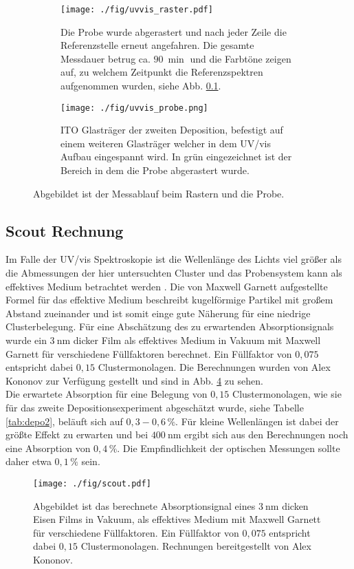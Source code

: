 \begin{figure}
    \begin{subfigure}[b]{0.65\textwidth}
      \texttt{[image: ./fig/uvvis\_raster.pdf]}
      \caption{Die Probe wurde abgerastert und nach jeder Zeile die Referenzstelle erneut angefahren. 
      Die gesamte Messdauer betrug ca. $\SI{90}{\min}$ und die Farbtöne zeigen auf, zu welchem Zeitpunkt die Referenzspektren aufgenommen wurden, siehe Abb. \ref{sec:scoutsim}.}
      \label{fig:uvvis_raster}
    \end{subfigure}\hfill
    \begin{subfigure}[b]{0.325\textwidth}
      \texttt{[image: ./fig/uvvis\_probe.png]}
      \caption{ITO Glasträger der zweiten Deposition, befestigt auf einem weiteren Glasträger welcher in dem UV/vis Aufbau eingespannt wird. In grün eingezeichnet ist der Bereich in dem die Probe abgerastert wurde.}
      \label{fig:uvvis_probe}
    \end{subfigure}
    \caption{Abgebildet ist der Messablauf beim Rastern und die Probe.} 
    \label{fig:uvvis_ablauf}
\end{figure}
\subsection{Scout Rechnung}
\label{sec:scoutsim}
Im Falle der UV/vis Spektroskopie ist die Wellenlänge des Lichts viel größer als die Abmessungen der hier untersuchten Cluster und das Probensystem kann als effektives Medium betrachtet werden \cite[S. 149 ff.]{Thei.1993}.
Die von Maxwell Garnett aufgestellte Formel für das effektive Medium beschreibt kugelförmige Partikel mit großem Abstand zueinander und ist somit einge gute Näherung für eine niedrige Clusterbelegung. 
Für eine Abschätzung des zu erwartenden Absorptionsignals wurde ein $\SI{3}{\nm}$ dicker Film als effektives Medium in Vakuum mit Maxwell Garnett für verschiedene Füllfaktoren berechnet.
Ein Füllfaktor von $0,075$ entspricht dabei $0,15$ Clustermonolagen.
Die Berechnungen wurden von Alex Kononov zur Verfügung gestellt und sind in Abb. \ref{fig:scout} zu sehen.\\
Die erwartete Absorption für eine Belegung von $0,15$ Clustermonolagen, wie sie für das zweite Depositionsexperiment abgeschätzt wurde, siehe Tabelle \ref{tab:depo2}, beläuft sich auf $0,3 - 0,6\,\%$.
Für kleine Wellenlängen ist dabei der größte Effekt zu erwarten und bei $\SI{400}{\nm}$ ergibt sich aus den Berechnungen noch eine Absorption von $0,4\,\%$. Die Empfindlichkeit der optischen Messungen sollte daher etwa $0,1\,\%$ sein.
\begin{figure}[h]
  \centering
  \texttt{[image: ./fig/scout.pdf]}
  \caption{Abgebildet ist das berechnete Absorptionsignal eines $\SI{3}{\nm}$ dicken Eisen Films in Vakuum, als effektives Medium mit Maxwell Garnett für verschiedene Füllfaktoren. Ein Füllfaktor von $0,075$ entspricht dabei $0,15$ Clustermonolagen. Rechnungen bereitgestellt von Alex Kononov.}
  \label{fig:scout}
\end{figure}


